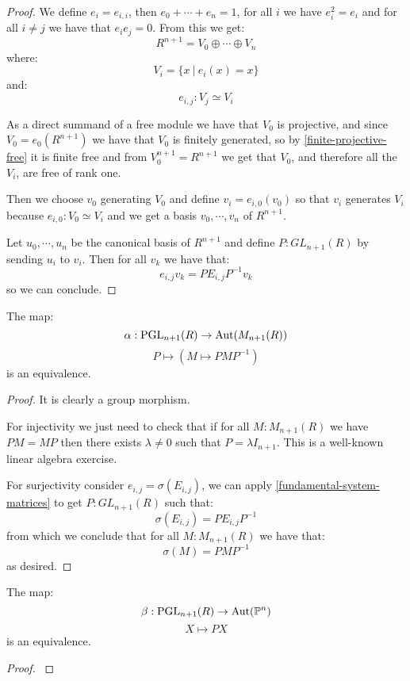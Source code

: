 \begin{proof}
We define $e_i = e_{i,i}$, then $e_0+\cdots+e_n = 1$, for all $i$ we have $e_i^2=e_i$ and for all $i\not=j$ we have that $e_ie_j=0$. From this we get:
\[R^{n+1} = V_0\oplus\cdots\oplus V_n\]
where:
\[V_i = \{x\ |\ e_i(x)=x\}\]
and:
\[e_{i,j}:V_j\simeq V_i\]

As a direct summand of a free module we have that $V_0$ is projective, and since $V_0 = e_{0}(R^{n+1})$ we have that $V_0$ is finitely generated, so by \cref{finite-projective-free} it is finite free and from $V_0^{n+1}=R^{n+1}$ we get that $V_0$, and therefore all the $V_i$, are free of rank one.

Then we choose $v_0$ generating $V_0$ and define $v_i = e_{i,0}(v_0)$ so that $v_i$ generates $V_i$ because $e_{i,0}:V_0\simeq V_i$ and we get a basis $v_0,\cdots,v_n$ of $R^{n+1}$.

Let $u_0,\cdots,u_n$ be the canonical basis of $R^{n+1}$ and define $P:GL_{n+1}(R)$ by sending $u_i$ to $v_i$. Then for all $v_k$ we have that:
\[e_{i,j}v_k = PE_{i,j}P^{-1}v_k\]
so we can conclude.
\end{proof}

\begin{proposition}\label{Aut-MnR-PGL}
The map:
\[\alpha:\operatorname{PGL}_{n+1}(R)\to\mathrm{Aut}(M_{n+1}(R))\]
\[P\mapsto (M\mapsto PMP^{-1})\]
is an equivalence.
\end{proposition}

\begin{proof}
It is clearly a group morphism. 

For injectivity we just need to check that if for all $M:M_{n+1}(R)$ we have $PM=MP$ then there exists $\lambda\not=0$ such that $P=\lambda I_{n+1}$. This is a well-known linear algebra exercise.

For surjectivity consider $e_{i,j}=\sigma(E_{i,j})$, we can apply \cref{fundamental-system-matrices} to get $P:GL_{n+1}(R)$ such that:
\[\sigma(E_{i,j}) = PE_{i,j}P^{-1}\]
from which we conclude that for all $M:M_{n+1}(R)$ we have that:
\[\sigma(M) = PMP^{-1}\]
as desired.
\end{proof}

\begin{proposition}\label{Aut-Pn-PGL}
The map:
\[\beta:\operatorname{PGL}_{n+1}(R)\to\mathrm{Aut}(\mathbb{P}^n)\]
\[X\mapsto PX\]
is an equivalence.
\end{proposition}

\begin{proof}
\cite{TODO}
\end{proof}



